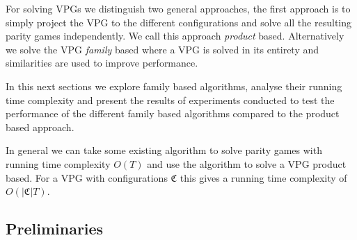 For solving VPGs we distinguish two general approaches, the first approach is to simply project the VPG to the different configurations and solve all the resulting parity games independently. We call this approach \textit{product} based. Alternatively we solve the VPG \textit{family} based where a VPG is solved in its entirety and similarities are used to improve performance. 

In this next sections we explore family based algorithms, analyse their running time complexity and present the results of experiments conducted to test the performance of the different family based algorithms compared to the product based approach.

In general we can take some existing algorithm to solve parity games with running time complexity $O(T)$ and use the algorithm to solve a VPG product based. For a VPG with configurations $\mathfrak{C}$ this gives a running time complexity of $O(|\mathfrak{C}|T)$.


\subsection{Preliminaries}
